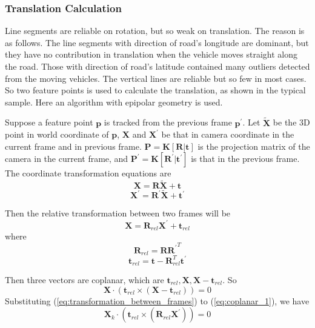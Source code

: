 \documentclass[letterpaper, 10 pt, conference]{ieeeconf}  %
\begin{document}
\subsubsection{Translation Calculation}
Line segments are reliable on rotation, but so weak on translation. The reason is as follows. The line segments with direction of road's longitude are dominant, but they have no contribution in translation when the vehicle moves straight along the road. Those with direction of road's latitude contained many outliers detected from the moving vehicles. The vertical lines are reliable but so few in most cases. So two feature points is used to calculate the translation, as shown in the typical sample. Here an algorithm with epipolar geometry is used.

Suppose a feature point $\mathbf{p}$ is tracked from the previous frame $\mathbf{p}^\prime$. Let $\widetilde{\mathbf{X}}$ be the 3D point in world coordinate of $\mathbf{p}$, $\mathbf{X}$ and $\mathbf{X}^\prime$ be that in camera coordinate in the current frame and in previous frame. $\mathbf{P}=\mathbf{K}[\mathbf{R}|\mathbf{t}]$ is the projection matrix of the camera in the current frame, and $\mathbf{P}^\prime=\mathbf{K}[\mathbf{R}^\prime|\mathbf{t}^\prime]$ is that in the previous frame. The coordinate transformation equations are
\begin{equation}
\mathbf{X}    =\mathbf{R}       \widetilde{\mathbf{X}}+\mathbf{t}
\end{equation}
\begin{equation}
\mathbf{X}^\prime=\mathbf{R}^\prime   \widetilde{\mathbf{X}}+\mathbf{t}^\prime
\end{equation}

Then the relative transformation between two frames will be
\begin{equation}
\mathbf{X}=\mathbf{R}_{rel} \mathbf{X}^\prime + \mathbf{t}_{rel}
\label{eq:transformation_between_frames}
\end{equation}
where
\begin{equation}
\mathbf{R}_{rel} = \mathbf{R} {\mathbf{R}^\prime}^T
\end{equation}
\begin{equation}
\mathbf{t}_{rel}=\mathbf{t} - \mathbf{R}_{rel}^T \mathbf{t}^\prime
\end{equation}

Then three vectors are coplanar, which are $\mathbf{t}_{rel},\mathbf{X},\mathbf{X}-\mathbf{t}_{rel}$. So
\begin{equation}
  \mathbf{X}\cdot\left(\mathbf{t}_{rel}\times\left(\mathbf{X}-\mathbf{t}_{rel}\right)\right)=0
  \label{eq:coplanar_1}
\end{equation}
Substituting (\ref{eq:transformation_between_frames}) to (\ref{eq:coplanar_1}), we have
\begin{equation}
  \mathbf{X}_k\cdot\left(\mathbf{t}_{rel}\times\left(\mathbf{R}_{rel}\mathbf{X}^\prime\right)\right)=0
\end{equation}
\end{document}
